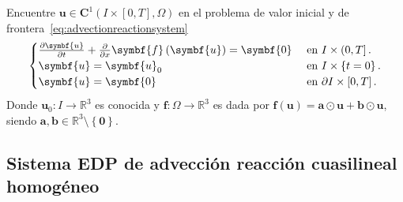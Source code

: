 Encuentre
\begin{math}
	\symbf{u}\in
	\symbf{C}^{1}\left(I\times\left[0,T\right],\Omega\right)
\end{math}
en el problema de valor inicial y de frontera~\eqref{eq:advectionreactionsystem}
\begin{equation}\label{eq:advectionreactionsystem}
	\begin{cases}
		\diffp{\symbf{u}}{t}+\diffp{}{x}\symbf{f}\left(\symbf{u}\right)               =
		\symbf{0}     &
		\text{ en }I\times\left(0,T\right].   \\
		\symbf{u}                                                                     =
		\symbf{u}_{0} &
		\text{ en }I\times\left\{t=0\right\}. \\
		\symbf{u}                                                                     =
		\symbf{0}     &
		\text{ en }\partial I\times\left[0,T\right].
	\end{cases}
\end{equation}
Donde
\begin{math}
	\symbf{u}_{0}\colon I\to
	\mathbb{R}^{3}
\end{math}
es conocida y
\begin{math}
	\symbf{f}\colon\Omega\to
	\mathbb{R}^{3}
\end{math}
es dada por
\begin{math}
	\symbf{f}\left(\symbf{u}\right)=
	\symbf{a}\odot\symbf{u}+
	\symbf{b}\odot\symbf{u}
\end{math},
siendo $\symbf{a},\symbf{b}\in\mathbb{R}^{3}\setminus\left\{\symbf{0}\right\}$.

\subsection*{Sistema EDP de advección reacción cuasilineal homogéneo}

